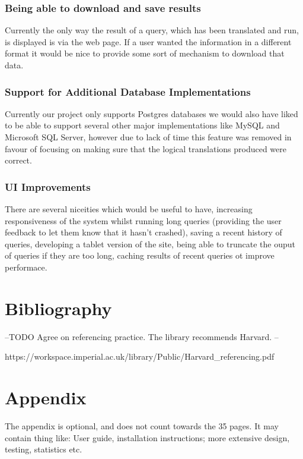 \documentclass[a4paper, 11pt]{article}
\begin{document}
    \subsubsection{Being able to download and save results}
    Currently the only way the result of a query, which has been translated and
    run, is displayed is via the web page. If a user wanted the information in a
    different format it would be nice to provide some sort of mechanism to
    download that data.
    \subsubsection{Support for Additional Database Implementations} 
    Currently our project only supports Postgres databases we would also have
    liked to be able to support several other major implementations like MySQL and
    Microsoft SQL Server, however due to lack of time this feature was removed
    in favour of focusing on making sure that the logical translations produced
    were correct. 
    \subsubsection{UI Improvements}
    There are several niceities which would be useful to have, increasing
    responsiveness of the system whilst running long queries (providing the user
    feedback to let them know that it hasn't crashed), saving a recent history
    of queries, developing a tablet version of the site, being able to truncate
    the ouput of queries if they are too long, caching results of recent queries
    ot improve performace. 


   
    

\section{Bibliography}
  \printbibliography

  --TODO Agree on referencing practice. The library recommends Harvard. --

  https://workspace.imperial.ac.uk/library/Public/Harvard\_referencing.pdf

\appendix
\section{Appendix}
  The appendix is optional, and does not count towards the 35 pages. It may
  contain thing like: User guide, installation instructions; more extensive
  design, testing, statistics etc.
\end{document}

